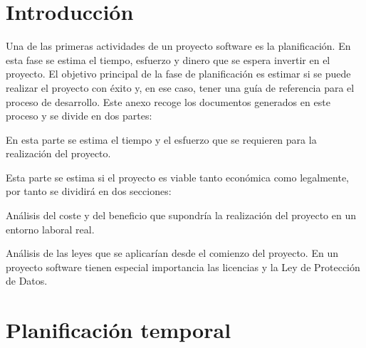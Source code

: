 \label{anex:A}

\section{Introducción}

Una de las primeras actividades de un proyecto software es la planificación. En esta fase se estima el tiempo, esfuerzo y dinero que se espera invertir en el proyecto. El objetivo principal de la fase de planificación es estimar si se puede realizar el proyecto con éxito y, en ese caso, tener una guía de referencia para el proceso de desarrollo. Este anexo recoge los documentos generados en este proceso y se divide en dos partes:
\begin{description}
	\tightlist
	\item[Planificación temporal.] En esta parte se estima el tiempo y el esfuerzo que se requieren para la realización del proyecto.
	\item[Estudio de la viabilidad.] Esta parte se estima si el proyecto es viable tanto económica como legalmente, por tanto se dividirá en dos secciones:
	\begin{description}
		\tightlist
		\item[Viabilidad económica.] Análisis del coste y del beneficio que supondría la realización del proyecto en un entorno laboral real.
		\item[Viabilidad legal.] Análisis de las leyes que se aplicarían desde el comienzo del proyecto. En un proyecto software tienen especial importancia las licencias y la Ley de Protección de Datos.
	\end{description}
\end{description}

\section{Planificación temporal}

